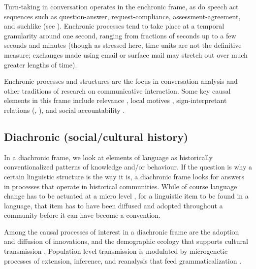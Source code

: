 Turn-taking in conversation operates in the enchronic 
frame, as do speech act sequences such as question-answer, 
request-compliance, assessment-agreement, and suchlike (see \citealt{enfield_language_2014}). Enchronic processes tend to take place at a temporal 
granularity around one second, ranging from fractions of seconds up to 
a few seconds and minutes (though as stressed here, time units are not 
the definitive measure; exchanges made using email or surface mail may stretch out over much greater lengths of time). 



Enchronic processes and structures are the focus in 
conversation analysis and other traditions of research on communicative 
interaction. Some key causal elements in this frame include relevance \citep{garfinkel_studies_1967,grice_logic_1975,dan_sperber_relevance:_1995}, local motives \citep{schutz_phenomenology_1970,leontev_problems_1981,heritage_garfinkel_1984}, sign-interpretant relations (\citealt{kockelman_semiotic_2005,kockelman_agent_2013}, \citealt[Ch 4]{enfield_relationship_2013}), and social accountability \citep{garfinkel_studies_1967,heritage_garfinkel_1984}.



\subsection{Diachronic (social/cultural history)}


In a diachronic frame, we look at elements of language as historically 
conventionalized patterns of knowledge and/or behaviour. If the question 
is why a certain linguistic structure is the way it is, a diachronic 
frame looks for answers in processes that operate in historical 
communities. While of course language change has to be actuated at a 
micro level \citep{weinreich_empirical_1968,labov_mechanism_1986,eckert_linguistic_2000}, for a linguistic item to be found in a language, that 
item has to have been diffused and adopted throughout a community 
before it can have become a convention. 



Among the causal processes of interest in a diachronic frame are the 
adoption and diffusion of innovations, and the demographic ecology that 
supports cultural transmission \citep{rogers_diffusion_2003}. Population-level 
transmission is modulated by microgenetic processes of extension, inference, and reanalysis that feed grammaticalization 
\citep{hopper_grammaticalization_1993}. 



